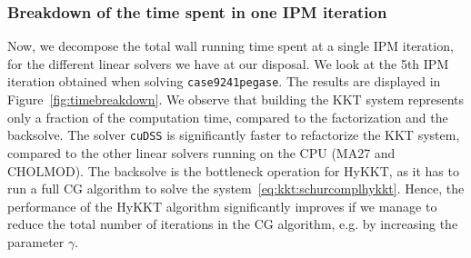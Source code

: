 \begin{table}[!ht]
  \centering
  \label{tab:sckkt:performance}
  \caption{Performance of the equality-relaxation
    strategy as we decrease the IPM tolerance $\varepsilon_{tol}$.
    The table displays the wall time on the CPU (using CHOLMOD)
    and on the GPU (using cuDSS). We display the
    relative errors on the objective $\delta_{obj} = (f(x_{hsl}^\sharp) - f(x_{sc}^\sharp))/f(x_{hsl}^\sharp)$
    and on the primal solution $\delta_x = \|x_{hsl}^\sharp - x_{sc}^\sharp\|_\infty
    / \|x_{hsl}^\sharp\|_\infty$. (A30 GPU)
  }
\end{table}


\subsubsection{Breakdown of the time spent in one IPM iteration}
Now, we decompose the total wall running time spent at a single
IPM iteration, for the different linear solvers we have at our disposal.
We look at the 5th IPM iteration obtained when solving {\tt case9241pegase}.
The results are displayed in Figure~\ref{fig:timebreakdown}. We observe
that building the KKT system represents only a fraction of the computation time, compared
to the factorization and the backsolve. The solver {\tt cuDSS} is significantly
faster to refactorize the KKT system, compared to the other linear solvers running on the CPU (MA27 and CHOLMOD).
The backsolve is the bottleneck operation for HyKKT, as it has to run a
full CG algorithm to solve the system~\eqref{eq:kkt:schurcomplhykkt}. Hence, the performance
of the HyKKT algorithm significantly improves if we manage to reduce the total
number of iterations in the CG algorithm, e.g. by increasing the parameter $\gamma$.

